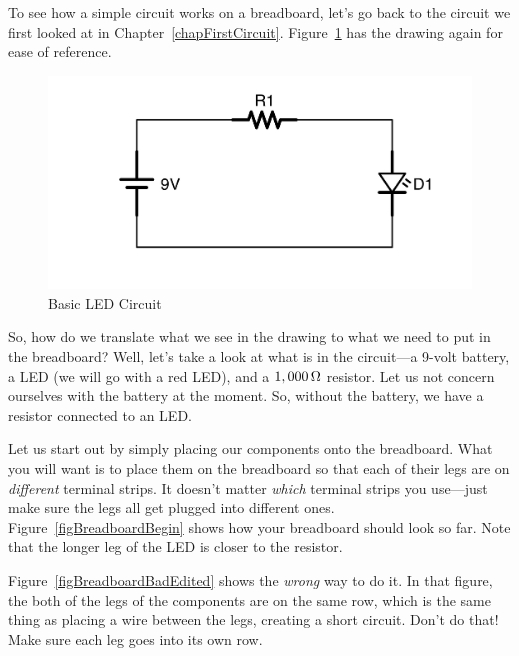 To see how a simple circuit works on a breadboard, let's go back to the circuit we first looked at in Chapter~\ref{chapFirstCircuit}.
Figure~\ref{figCircuitBasicLEDRepeat} has the drawing again for ease of reference.

\begin{figure}
\caption{Basic LED Circuit}
\label{figCircuitBasicLEDRepeat}
\centering
\includegraphics[scale=0.125]{CircuitBasicLED.png}
\end{figure}

So, how do we translate what we see in the drawing to what we need to put in the breadboard?
Well, let's take a look at what is in the circuit---a 9-volt battery, a LED (we will go with a red LED), and a $1,000\,\si{\ohm}$ resistor.
Let us not concern ourselves with the battery at the moment.
So, without the battery, we have a resistor connected to an LED.

Let us start out by simply placing our components onto the breadboard.
What you will want is to place them on the breadboard so that each of their legs are on \emph{different} terminal strips.
It doesn't matter \emph{which} terminal strips you use---just make sure the legs all get plugged into different ones.
Figure~\ref{figBreadboardBegin} shows how your breadboard should look so far.
Note that the longer leg of the LED is closer to the resistor.

Figure~\ref{figBreadboardBadEdited} shows the \emph{wrong} way to do it.
In that figure, the both of the legs of the components are on the same row, which is the same thing as placing a wire between the legs, creating a short circuit.
Don't do that!  Make sure each leg goes into its own row.



